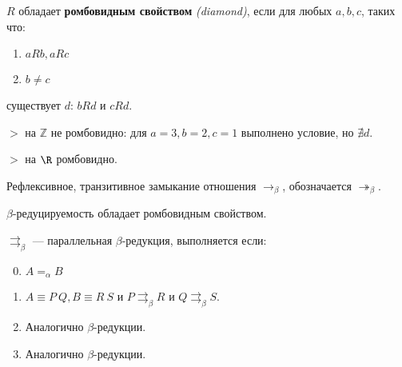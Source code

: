 \begin{definition}
    \(R\) обладает \textbf{ромбовидным свойством} \textit{(diamond)}, если для любых \(a,b,c\), таких что:
    \begin{enumerate}
        \item \(aRb, aRc\)
        \item \(b \neq c\)
    \end{enumerate}
    существует \(d\): \(bRd\) и \(cRd\).

    \begin{center}
    \end{center}
\end{definition}

\begin{example}
    \( > \) на \(\mathbb{Z}\) не ромбовидно: для \(a = 3, b = 2, c = 1\) выполнено условие, но \(\nexists d\).

    \( > \) на \(\R\) ромбовидно.
\end{example}

\begin{definition}
    Рефлексивное, транзитивное замыкание отношения \( \to_\beta\), обозначается \( \twoheadrightarrow_\beta\).
\end{definition}

\begin{theorem}
    \label{чр}
    \(\beta\)-редуцируемость обладает ромбовидным свойством.
\end{theorem}

\begin{definition}
    \(\rightrightarrows_\beta\) --- параллельная \(\beta\)-редукция, выполняется если:
    \begin{enumerate}
        \setcounter{enumi}{-1}
        \item \(A =_\alpha B\)
        \item \(A \equiv P\ Q, B \equiv R\ S\) и \(P \rightrightarrows_\beta R\) и \(Q \rightrightarrows_\beta S\).
        \item Аналогично \(\beta\)-редукции.
        \item Аналогично \(\beta\)-редукции.
    \end{enumerate}
\end{definition}

